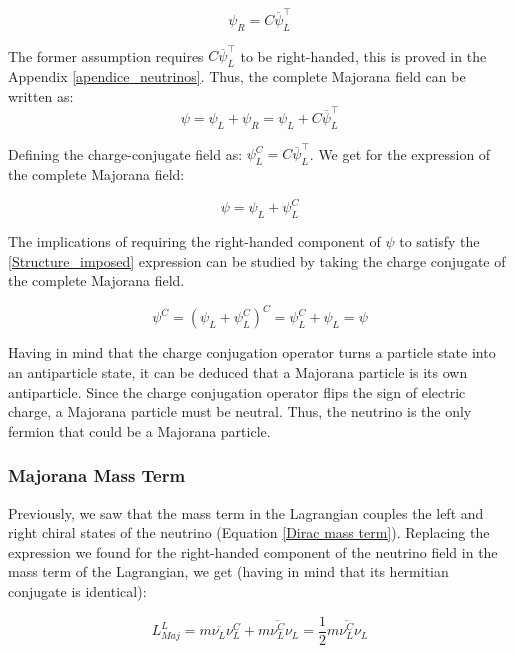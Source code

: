 \begin{equation}
\psi_R = C \overline{\psi}^\intercal_L
\end{equation}

The former assumption requires $C \overline{\psi}^\intercal_L$ to be right-handed, this is proved in the Appendix \ref{apendice_neutrinos}. Thus, the complete Majorana 
field can be written as:
\begin{equation}
\psi = \psi_L + \psi_R = \psi_L + C \overline{\psi}^\intercal_L
\end{equation}

Defining the charge-conjugate field as: $\psi^C_L = C \overline{\psi}^\intercal_L$. We get for the expression of the complete Majorana field:

\begin{equation} \label{Structure_imposed}
\psi = \psi_L + \psi^C_L
\end{equation}

The implications of requiring the right-handed component of $\psi$ to satisfy the \ref{Structure_imposed} expression can be studied by taking the charge conjugate of the complete Majorana field. 

\begin{equation}
\psi^C = (\psi_L + \psi^C_L)^C = \psi^C_L + \psi_L = \psi
\end{equation}

Having in mind that the charge conjugation operator turns a particle state into an antiparticle state, it can be deduced that a Majorana particle is its own antiparticle.
Since the charge conjugation operator flips the sign of electric charge, a Majorana particle must be neutral. Thus, the neutrino is the only fermion that could be a Majorana particle.

\subsubsection{Majorana Mass Term}

Previously, we saw that the mass term in the Lagrangian couples the left and right chiral states of the neutrino (Equation \ref{Dirac mass term}). Replacing the 
expression we found for the right-handed component of the neutrino field in the mass term of the Lagrangian, we get (having in mind that its hermitian conjugate 
is identical):


\begin{equation}
L_{Maj}^{L} = m \overline{\nu_L} \nu_L^C + m \overline{\nu_L^C} \nu_L = \frac{1}{2} m \overline{\nu_L^{C}} \nu_L
\end{equation}

